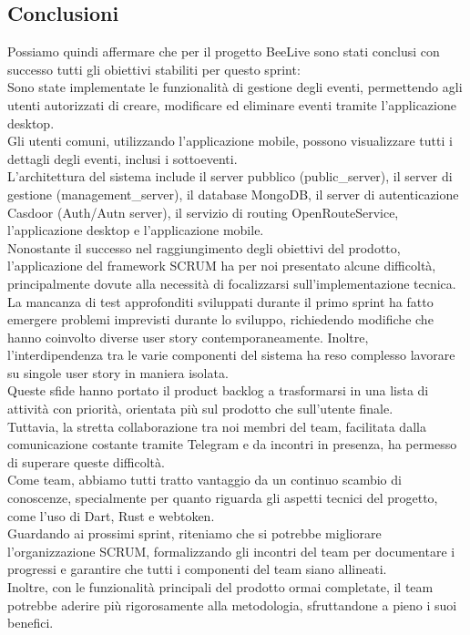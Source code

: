 \documentclass{article}
\begin{document}
\subsection{Conclusioni}

Possiamo quindi affermare che per il progetto BeeLive sono stati conclusi con successo tutti gli obiettivi stabiliti per questo sprint:\\
Sono state implementate le funzionalità di gestione degli eventi, permettendo agli utenti autorizzati di creare, modificare ed eliminare eventi tramite l'applicazione desktop.\\
Gli utenti comuni, utilizzando l'applicazione mobile, possono visualizzare tutti i dettagli degli eventi, inclusi i sottoeventi.\\
L'architettura del sistema include il server pubblico (public\_server), il server di gestione (management\_server), il database MongoDB, il server di autenticazione Casdoor (Auth/Autn server), il servizio di routing OpenRouteService, l'applicazione desktop e l'applicazione mobile.\\

Nonostante il successo nel raggiungimento degli obiettivi del prodotto, l'applicazione del framework SCRUM ha per noi presentato alcune difficoltà, principalmente dovute alla necessità di focalizzarsi sull'implementazione tecnica.\\
La mancanza di test approfonditi sviluppati durante il primo sprint ha fatto emergere problemi imprevisti durante lo sviluppo, richiedendo modifiche che hanno coinvolto diverse user story contemporaneamente. Inoltre, l'interdipendenza tra le varie componenti del sistema ha reso complesso lavorare su singole user story in maniera isolata.\\
Queste sfide hanno portato il product backlog a trasformarsi in una lista di attività con priorità, orientata più sul prodotto che sull'utente finale.\\

Tuttavia, la stretta collaborazione tra noi membri del team, facilitata dalla comunicazione costante tramite Telegram e da incontri in presenza, ha permesso di superare queste difficoltà.\\
Come team, abbiamo tutti tratto vantaggio da un continuo scambio di conoscenze, specialmente per quanto riguarda gli aspetti tecnici del progetto, come l'uso di Dart, Rust e webtoken.\\

Guardando ai prossimi sprint, riteniamo che si potrebbe migliorare l'organizzazione SCRUM, formalizzando gli incontri del team per documentare i progressi e garantire che tutti i componenti del team siano allineati.\\
Inoltre, con le funzionalità principali del prodotto ormai completate, il team potrebbe aderire più rigorosamente alla metodologia, sfruttandone a pieno i suoi benefici.\\
\end{document}
